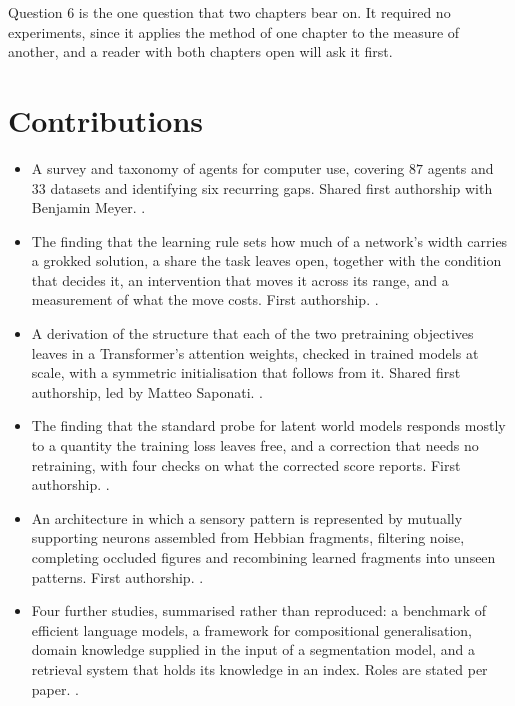 Question $6$ is the one question that two chapters bear on. It required no
experiments, since it applies the method of one chapter to the measure of
another, and a reader with both chapters open will ask it first.


\section{Contributions}
\label{sec:intro_contributions}

\begin{itemize}
    \item A survey and taxonomy of agents for computer use, covering $87$
    agents and $33$ datasets and identifying six recurring gaps. Shared first
    authorship with Benjamin Meyer. .

    \item The finding that the learning rule sets how much of a network's
    width carries a grokked solution, a share the task leaves open, together
    with the condition that decides it, an intervention that moves it across
    its range, and a measurement of what the move costs. First authorship.
    .

    \item A derivation of the structure that each of the two pretraining
    objectives leaves in a Transformer's attention weights, checked in trained
    models at scale, with a symmetric initialisation that follows from it.
    Shared first authorship, led by Matteo Saponati. .

    \item The finding that the standard probe for latent world models responds
    mostly to a quantity the training loss leaves free, and a correction that
    needs no retraining, with four checks on what the corrected score reports.
    First authorship. .

    \item An architecture in which a sensory pattern is represented by
    mutually supporting neurons assembled from Hebbian fragments, filtering
    noise, completing occluded figures and recombining learned fragments into
    unseen patterns. First authorship. .

    \item Four further studies, summarised rather than reproduced: a benchmark
    of efficient language models, a framework for compositional generalisation,
    domain knowledge supplied in the input of a segmentation model, and a
    retrieval system that holds its knowledge in an index. Roles are stated per
    paper. .


\end{itemize}
